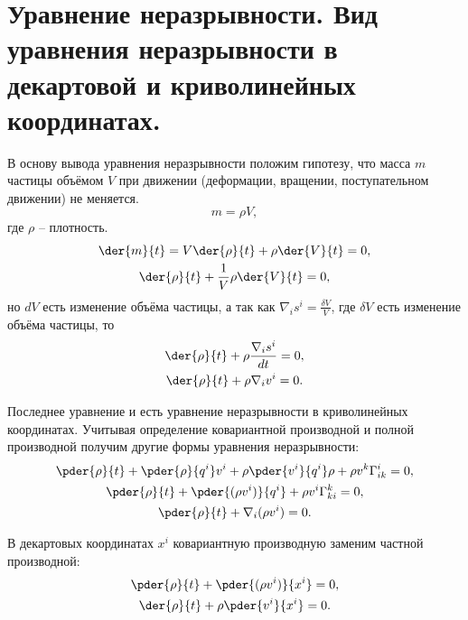 \chapter{Уравнение неразрывности. Вид уравнения неразрывности в декартовой и
криволинейных координатах.}

В основу вывода уравнения неразрывности положим гипотезу, что масса \( m \)
частицы объёмом \( V \) при движении (деформации, вращении, поступательном
движении) не меняется.
\[
    m = \rho V,
\]
где \( \rho \) -- плотность.
\begin{gather*}
    \der{m}{t} =V \der{\rho}{t}+ \rho \der{V}{t} = 0,\\
    \der{\rho}{t}+ \frac{1}{V} \rho \der{V}{t} = 0,
\end{gather*}
но \( dV \) есть изменение объёма частицы, а так как
\( \nabla_is^i = \frac{\delta V}{V} \), где \( \delta V \) есть изменение
объёма частицы, то
\begin{gather*}
    \der{\rho}{t}+ \rho \frac{\nabla_is^i}{dt} = 0, \\ 
    \der{\rho}{t}+ \rho {\nabla_iv^i} = 0.
\end{gather*}

Последнее уравнение и есть уравнение неразрывности в криволинейных координатах.
Учитывая определение ковариантной производной и полной производной получим
другие формы уравнения неразрывности:
\begin{gather*}
    \pder{\rho}{t} + 
    \pder{\rho}{q^i} v^i + 
    \rho \pder{v^i}{q^i} \rho  + 
    \rho v^k \Gamma^i_{ik} = 0, \\
    \pder{\rho}{t} + 
    \pder{(\rho v^i)}{q^i}   + 
    \rho v^i \Gamma^k_{ki} = 0, \\
    \pder{\rho}{t} + 
    \nabla_i(\rho v^i) = 0.
\end{gather*}

В декартовых координатах \( x^i \) ковариантную производную заменим
частной производной:
\begin{gather*}
    \pder{\rho}{t} + 
    \pder{(\rho v^i)}{x^i} = 0, \\
    \der{\rho}{t} + 
    \rho\pder{v^i}{x^i} = 0.
\end{gather*}       


\newpage
